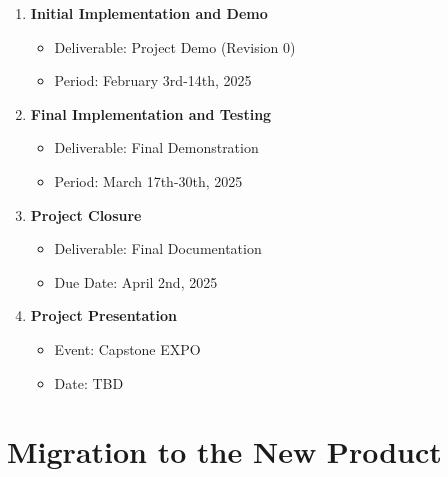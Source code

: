 \documentclass[12pt]{article}
\begin{document}
\begin{enumerate}
    \item \textbf{Initial Implementation and Demo}
    \begin{itemize}
        \item Deliverable: Project Demo (Revision 0)
        \item Period: February 3rd-14th, 2025
    \end{itemize}
    
    \item \textbf{Final Implementation and Testing}
    \begin{itemize}
        \item Deliverable: Final Demonstration
        \item Period: March 17th-30th, 2025
    \end{itemize}
    
    \item \textbf{Project Closure}
    \begin{itemize}
        \item Deliverable: Final Documentation
        \item Due Date: April 2nd, 2025
    \end{itemize}
    
    \item \textbf{Project Presentation}
    \begin{itemize}
        \item Event: Capstone EXPO
        \item Date: TBD
    \end{itemize}
\end{enumerate}

\section{Migration to the New Product}
\end{document}
